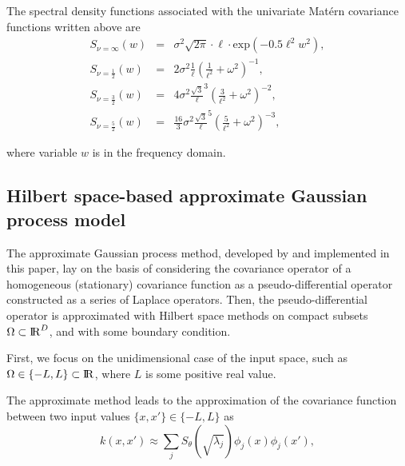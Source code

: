 \documentclass[]{interact}
\theoremstyle{plain}%
\theoremstyle{definition}
\theoremstyle{remark}
\begin{document}
The spectral density functions associated with the univariate Mat\'ern covariance functions written above are
%
\begin{eqnarray}
S_{\nu=\infty}(w)&=& \sigma^2 \sqrt{2\pi} \cdot \ell \cdot \text{exp}(-0.5 \ell^2 w^2), \nonumber \\
S_{\nu=\frac{1}{2}}(w)&=& 2\sigma^2 \frac{1}{\ell}(\frac{1}{\ell^2} + \omega^2)^{-1}, \nonumber \\
S_{\nu=\frac{3}{2}}(w)&=& 4\sigma^2 \frac{\sqrt{3}}{\ell}^{3}(\frac{3}{\ell^2} + \omega^2)^{-2}, \nonumber \\
S_{\nu=\frac{5}{2}}(w)&=& \frac{16}{3}\sigma^2 \frac{\sqrt{3}}{\ell}^{5}(\frac{5}{\ell^2} + \omega^2)^{-3}, \nonumber 
\end{eqnarray}

\noindent where variable $w$ is in the frequency domain.


\subsection{Hilbert space-based approximate Gaussian process model}

The approximate Gaussian process method, developed by \cite{solin2018hilbert} and implemented in this paper, lay on the basis of considering the covariance operator of a homogeneous (stationary) covariance function as a pseudo-differential operator constructed as a series of Laplace operators. Then, the pseudo-differential operator is approximated with Hilbert space methods on compact subsets $\Omega \subset {\rm I\!R}^D$, and with some boundary condition. 

First, we focus on the unidimensional case of the input space, such as $\Omega \in \{-L,L\} \subset {\rm I\!R}$, where $L$ is some positive real value. 

\vspace{0.2cm}
The approximate method leads to the approximation of the covariance function between two input values $\{x,x'\} \in \{-L,L\}$ as 
%
\begin{equation}\label{approxcov}
k(x,x') \approx \sum_{j}S_{\theta}(\sqrt{\lambda_j}) \phi_j(x) \phi_j(x'),
\end{equation} 
\end{document}
